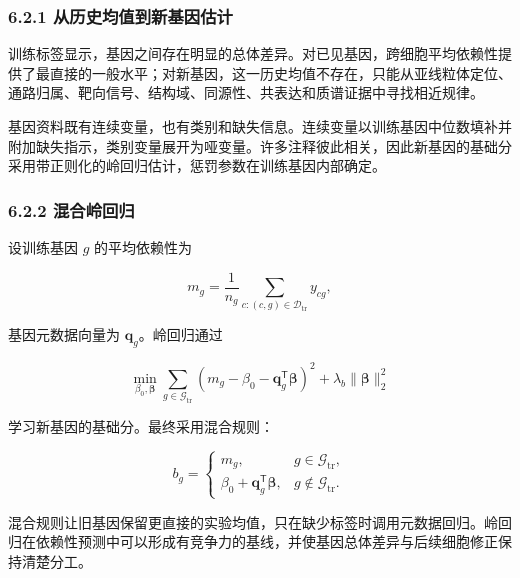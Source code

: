 \hypertarget{621-ux4eceux5386ux53f2ux5747ux503cux5230ux65b0ux57faux56e0ux4f30ux8ba1}{%
\subsubsection{6.2.1 从历史均值到新基因估计}\label{621-ux4eceux5386ux53f2ux5747ux503cux5230ux65b0ux57faux56e0ux4f30ux8ba1}}

训练标签显示，基因之间存在明显的总体差异。对已见基因，跨细胞平均依赖性提供了最直接的一般水平；对新基因，这一历史均值不存在，只能从亚线粒体定位、通路归属、靶向信号、结构域、同源性、共表达和质谱证据中寻找相近规律。

基因资料既有连续变量，也有类别和缺失信息。连续变量以训练基因中位数填补并附加缺失指示，类别变量展开为哑变量。许多注释彼此相关，因此新基因的基础分采用带正则化的岭回归估计，惩罚参数在训练基因内部确定。

\hypertarget{622-ux6df7ux5408ux5cadux56deux5f52}{%
\subsubsection{6.2.2 混合岭回归}\label{622-ux6df7ux5408ux5cadux56deux5f52}}

设训练基因 \(g\) 的平均依赖性为

\begin{equation}
\label{eq:gene-mean}
m_g=\frac{1}{n_g}\sum_{c:(c,g)\in\mathcal D_{\mathrm{tr}}}y_{cg},
\end{equation}

基因元数据向量为 \(\boldsymbol q_g\)。岭回归通过

\begin{equation}
\label{eq:ridge-objective}
\min_{\beta_0,\boldsymbol\beta}
\sum_{g\in\mathcal G_{\mathrm{tr}}}
\left(m_g-\beta_0-\boldsymbol q_g^{\mathsf T}\boldsymbol\beta\right)^2
+\lambda_b\lVert\boldsymbol\beta\rVert_2^2
\end{equation}

学习新基因的基础分。最终采用混合规则：

\begin{equation}
\label{eq:mixed-base-score}
b_g=
\begin{cases}
m_g, & g\in\mathcal G_{\mathrm{tr}},\\
\beta_0+\boldsymbol q_g^{\mathsf T}\boldsymbol\beta,
& g\notin\mathcal G_{\mathrm{tr}}.
\end{cases}
\end{equation}

混合规则让旧基因保留更直接的实验均值，只在缺少标签时调用元数据回归。岭回归在依赖性预测中可以形成有竞争力的基线\cite{ref9}，并使基因总体差异与后续细胞修正保持清楚分工。

